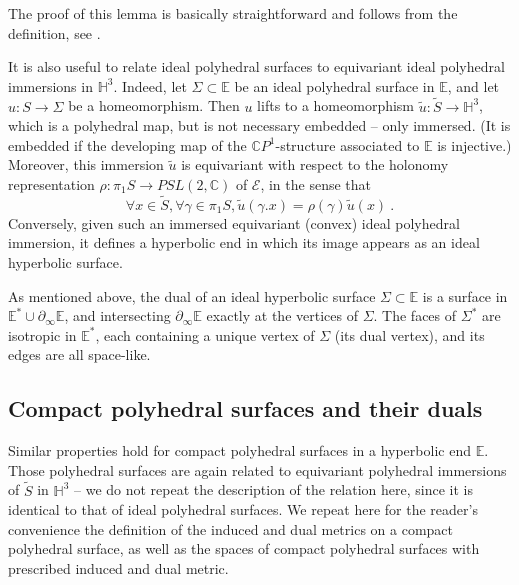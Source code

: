 \documentclass[notitlepage,twoside,a4paper]{amsart}
\theoremstyle{named}
\newcommand{\C}{{\mathbb C}}
\newcommand{\CP}{{\mathbb CP}}
\newcommand{\HH}{{\mathbb H}}
\newcommand{\bE}{{\mathbb E}}
\newcommand{\cE}{{\mathcal E}}
\newcounter{notes}%
\newcommand{\marginnote}[1]{
\refstepcounter{notes}  %
\nolinebreak
$\hspace{-5pt}{}^{\text{\tiny \rm \arabic{notes}}}$
\marginpar{\tiny \arabic{notes}) #1}
}
\begin{document}
The proof of this lemma is basically straightforward and follows from the definition, see \cite{delaunay}.

It is also useful to relate ideal polyhedral surfaces to equivariant ideal polyhedral immersions in $\HH^3$. Indeed, let $\Sigma\subset \bE$ be an ideal polyhedral surface in $\bE$, and let $u:S\to \Sigma$ be a homeomorphism. Then $u$ lifts to a homeomorphism $\tilde u: \tilde S\to \HH^3$, which is a polyhedral map, but is not necessary embedded -- only immersed. (It is embedded if the developing map of the $\CP^1$-structure associated to $\bE$ is injective.) Moreover, this immersion $\tilde u$ is equivariant with respect to the holonomy representation $\rho:\pi_1S\to PSL(2,\C)$ of $\cE$, in the sense that
$$ \forall x\in \tilde S, \forall \gamma\in \pi_1S, \tilde u(\gamma.x)=\rho(\gamma)\tilde u(x)~. $$
Conversely, given such an immersed equivariant (convex) ideal polyhedral immersion, it defines a hyperbolic end in which its image appears as an ideal hyperbolic surface.

As mentioned above, the dual of an ideal hyperbolic surface $\Sigma\subset \bE$ is a surface in $\bE^*\cup\partial_\infty\bE$, and intersecting $\partial_\infty\bE$ exactly at the vertices of $\Sigma$. The faces of $\Sigma^*$ are isotropic in $\bE^*$, each containing a unique vertex of $\Sigma$ (its dual vertex), and its edges are all space-like.

\subsection{Compact polyhedral surfaces and their duals}
\label{ssc:compact-dual}

Similar properties hold for compact polyhedral surfaces in a hyperbolic end $\bE$. Those polyhedral surfaces are again related to equivariant polyhedral immersions of $\tilde S$ in $\HH^3$ -- we do not repeat the description of the relation here, since it is identical to that of ideal polyhedral surfaces. %
We repeat here for the reader's convenience the definition of the induced and dual metrics on a compact polyhedral surface, as well as the spaces of compact polyhedral surfaces with prescribed induced and dual metric.
\end{document}
